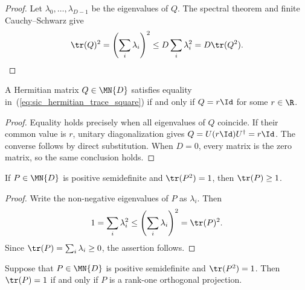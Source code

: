 \begin{proof}\leanok
    Let $\lambda_0,\ldots,\lambda_{D-1}$ be the eigenvalues of $Q$.
    The spectral theorem and finite Cauchy--Schwarz give
    \begin{align}
        \tr(Q)^2
        =\left(\sum_i\lambda_i\right)^2
        \le D\sum_i\lambda_i^2
        =D\tr(Q^2).
    \end{align}
\end{proof}

\begin{theorem}
    \label{thm:sic_hermitian_trace_square_equality}
    \leanok
    A Hermitian matrix $Q\in\MN{D}$ satisfies equality
    in~(\ref{eq:sic_hermitian_trace_square}) if and only if
    $Q=r\Id$ for some $r\in\R$.
\end{theorem}

\begin{proof}\leanok
    Equality holds precisely when all eigenvalues of $Q$ coincide. If their
    common value is $r$, unitary diagonalization gives
    $Q=U(r\Id)U^\dagger=r\Id$. The converse follows by direct substitution.
    When $D=0$, every matrix is the zero matrix, so the same conclusion holds.
\end{proof}

\begin{theorem}
    \label{thm:sic_psd_unit_purity_trace}
    \leanok
    If $P\in\MN{D}$ is positive semidefinite and $\tr(P^2)=1$, then
    $\tr(P)\ge 1$.
\end{theorem}

\begin{proof}\leanok
    Write the non-negative eigenvalues of $P$ as $\lambda_i$. Then
    \begin{align}
        1=\sum_i\lambda_i^2
        \le\left(\sum_i\lambda_i\right)^2
        =\tr(P)^2.
    \end{align}
    Since $\tr(P)=\sum_i\lambda_i\ge0$, the assertion follows.
\end{proof}

\begin{theorem}
    \label{thm:sic_psd_unit_purity_equality}
    \leanok
    Suppose that $P\in\MN{D}$ is positive semidefinite and $\tr(P^2)=1$.
    Then $\tr(P)=1$ if and only if $P$ is a rank-one orthogonal projection.
\end{theorem}

